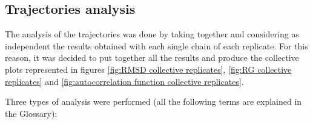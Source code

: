 \subsection{Trajectories analysis} \label{chap: trajectory analysis}

The analysis of the trajectories was done by taking together and considering as independent the results obtained with each single chain of each replicate. For this reason, it was decided to put together all the results and produce the collective plots represented in figures \ref{fig:RMSD collective replicates}, \ref{fig:RG collective replicates} and \ref{fig:autocorrelation function collective replicates}.

Three types of analysis were performed (all the following terms are explained in the Glossary): 

